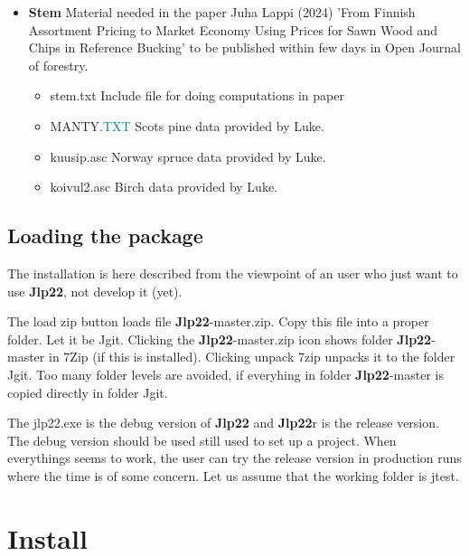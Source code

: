 \begin{itemize}
\item\textbf{Stem} \hspace{0.2cm}  Material needed in the paper 
Juha Lappi (2024) 'From Finnish Assortment Pricing to Market 
Economy Using Prices for Sawn Wood and 
Chips in Reference Bucking' to be  published within few days in Open Journal of forestry. 
\begin{itemize} 
\item stem.txt \hspace{0.2cm}Include file for doing computations in paper 
\item MANTY.\textcolor{teal}{TXT} \hspace{0.2cm}Scots pine data provided by Luke. 
\item kuusip.asc \hspace{0.2cm}Norway spruce data provided by Luke. 
\item koivul2.asc \hspace{0.2cm} Birch data provided by Luke. 
 
\end{itemize} 
 
 
\end{itemize} 
 
\subsection{Loading the package} 
\label{gitload} 
 
The installation is here described from the viewpoint of an user 
who just want to use \textbf{Jlp22}, not develop it (yet). 
 
The load zip button loads file \textbf{Jlp22}-master.zip. Copy this file into a proper folder. 
Let it be Jgit. Clicking the \textbf{Jlp22}-master.zip icon shows folder \textbf{Jlp22}-master in 
7Zip (if this is installed). Clicking unpack 7zip unpacks it to the folder Jgit. 
Too many folder levels are avoided, if everyhing in folder \textbf{Jlp22}-master 
is copied directly in 
folder Jgit. 
 
The jlp22.exe is the debug version of \textbf{Jlp22} and \textbf{Jlp22}r is the release version. 
The debug version should be 
used still used to set up a project. When everythings seems to work, the user 
can try the release version in production runs where the time is of some concern. 
Let us assume that the working folder is jtest. 
\section{Install} 
\label{install} 
